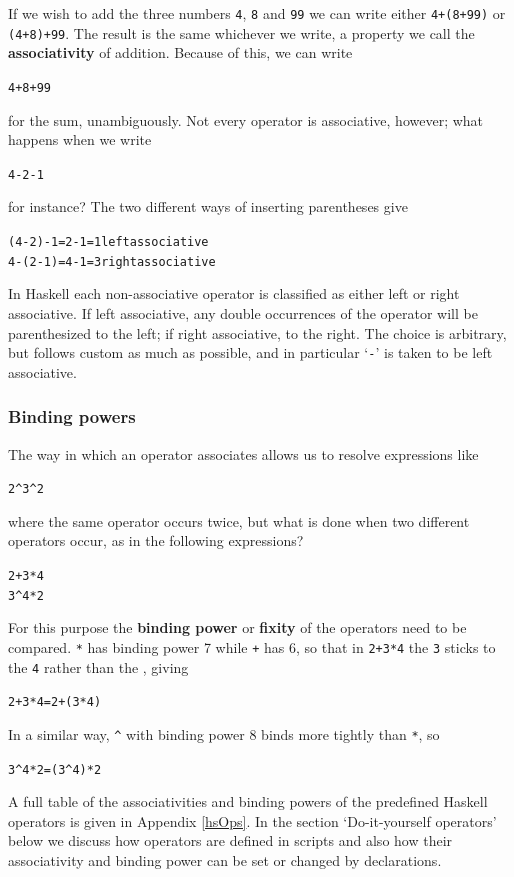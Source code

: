 If we wish to add the three numbers \texttt{4}, \texttt{8} and \texttt{99} we can write
either \texttt{4+(8+99)} or \texttt{(4+8)+99}. The result is the same whichever we
write, a property we call the \textbf{associativity} of addition. Because of
this, we can write 
\begin{alltt}
4+8+99
\end{alltt}
for the sum, unambiguously. Not every operator is associative, however; what
happens when we write
\begin{alltt}
4-2-1
\end{alltt}
for instance? 
The two different ways of inserting parentheses give
\begin{alltt}
(4-2)-1 = 2-1 = 1\hfill{\rm left associative}
4-(2-1) = 4-1 = 3 \hfill{\rm right associative}
\end{alltt}
In Haskell 
each non-associative operator is classified as either left or right
associative. If left associative, any double occurrences of the operator
will be parenthesized to the left; if right associative, to the right. The
choice is arbitrary, but follows custom as much as possible, and in
particular `\texttt{-}' is taken to be left associative.

\subsubsection*{Binding powers}
 
The way in which an operator associates allows us to resolve expressions like
\begin{alltt}
2\^{}3\^{}2
\end{alltt}
where the same operator occurs twice, but what is done when two different
operators occur, as in the following expressions?
\begin{alltt}
2+3*4
3\^{}4*2
\end{alltt}
For this purpose the \textbf{binding power} or \textbf{fixity}
of the operators
need to be compared. \texttt{*} has binding power 7 while \texttt{+} has 6, so
that in \texttt{2+3*4} the \texttt{3} sticks to the \texttt{4} rather than the {}, giving

\begin{alltt}
2+3*4 = 2+(3*4)
\end{alltt}
In a similar way, \texttt{\^{}} with binding power 8
binds more tightly than \texttt{*}, so

\begin{alltt}
3\^{}4*2 = (3\^{}4)*2
\end{alltt}
A full table of the associativities and binding powers of the predefined
Haskell operators is given in Appendix \ref{hsOps}. 
In the section `Do-it-yourself operators' below we discuss how
operators are defined in scripts and also how their associativity and binding
power can be set or changed by declarations. 

